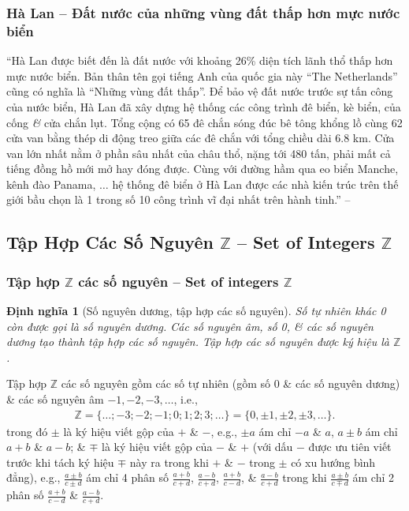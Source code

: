 \documentclass{article}
\numberwithin{equation}{section}
\newtheorem{dinhnghia}{Định nghĩa}[section]
\begin{document}
\subsubsection{Hà Lan -- Đất nước của những vùng đất thấp hơn mực nước biển}
``Hà Lan được biết đến là đất nước với khoảng 26\% diện tích lãnh thổ thấp hơn mực nước biển. Bản thân tên gọi tiếng Anh của quốc gia này ``The Netherlands'' cũng có nghĩa là ``Những vùng đất thấp''. Để bảo vệ đất nước trước sự tấn công của nước biển, Hà Lan đã xây dựng hệ thống các công trình đê biển, kè biển, của cống \textit{\&} cửa chắn lụt. Tổng cộng có 65 đê chắn sóng đúc bê tông khổng lồ cùng 62 cửa van bằng thép di động treo giữa các đê chắn với tổng chiều dài 6.8 km. Cửa van lớn nhất nằm ở phần sâu nhất của châu thổ, nặng tới 480 tấn, phải mất cả tiếng đồng hồ mới mở hay đóng được. Cùng với đường hầm qua eo biển Manche, kênh đào Panama, $\ldots$ hệ thống đê biển ở Hà Lan được các nhà kiến trúc trên thế giới bầu chọn là 1 trong số 10 công trình vĩ đại nhất trên hành tinh.'' -- \cite[p. 63]{SGK_Toan_6_Canh_Dieu_tap_1}


\subsection{Tập Hợp Các Số Nguyên $\mathbb{Z}$ -- Set of Integers $\mathbb{Z}$}

\subsubsection{Tập hợp $\mathbb{Z}$ các số nguyên -- Set of integers $\mathbb{Z}$}

\begin{dinhnghia}[Số nguyên dương, tập hợp các số nguyên]
	Số tự nhiên khác 0 còn được gọi là \emph{số nguyên dương}. Các số nguyên âm, số 0, \textit{\&} các số nguyên dương tạo thành tập hợp các số nguyên. Tập hợp các số nguyên được ký hiệu là $\mathbb{Z}$.
\end{dinhnghia}
Tập hợp $\mathbb{Z}$ các số nguyên gồm các số tự nhiên (gồm số 0 \& các số nguyên dương) \& các số nguyên âm $-1,-2,-3,\ldots$, i.e.,
\begin{align*}
	\mathbb{Z} = \{\ldots;-3;-2;-1;0;1;2;3;\ldots\} = \{0,\pm 1,\pm 2,\pm 3,\ldots\}.
\end{align*}
trong đó $\pm$ là ký hiệu viết gộp của $+$ \& $-$, e.g., $\pm a$ ám chỉ $-a$ \& $a$, $a\pm b$ ám chỉ $a + b$ \& $a - b$; \& $\mp$ là ký hiệu viết gộp của $-$ \& $+$ (với dấu $-$ được ưu tiên viết trước khi tách ký hiệu $\mp$ này ra trong khi $+$ \& $-$ trong $\pm$ có xu hướng bình đẳng), e.g., $\frac{a\pm b}{c\pm d}$ ám chỉ 4 phân số $\frac{a + b}{c + d}$, $\frac{a - b}{c + d}$, $\frac{a + b}{c - d}$, \& $\frac{a - b}{c + d}$ trong khi  $\frac{a\pm b}{c\mp d}$ ám chỉ 2 phân số $\frac{a + b}{c - d}$ \& $\frac{a - b}{c + d}$.
\end{document}
